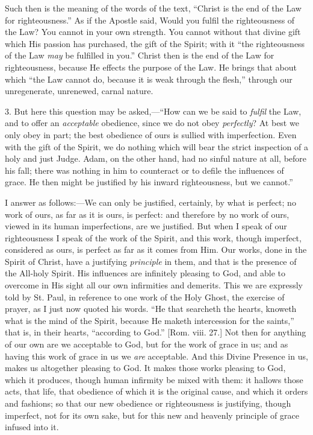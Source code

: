 Such then is the meaning of the words of the text, ``Christ is
the end of the Law for righteousness.'' As if the Apostle said,
Would you fulfil the righteousness of the Law? You cannot in your own
strength. You cannot without that divine gift which His passion has
purchased, the gift of the Spirit; with it ``the righteousness of
the Law \emph{may} be fulfilled in you.'' Christ then is the end
of the Law for righteousness, because He effects the purpose of the
Law. He brings that about which ``the Law cannot do, because it is
weak through the flesh,'' through our unregenerate, unrenewed,
carnal nature.

3. But here this question may be asked,—``How can we be said
to \emph{fulfil} the Law, and to offer an \emph{acceptable} obedience,
since we do not obey \emph{perfectly}? At best we only obey in part;
the best obedience of ours is sullied with imperfection. Even with the
gift of the Spirit, we do nothing which will bear the strict
inspection of a holy and just Judge. Adam, on the other hand, had no
sinful nature at all, before his fall; there was nothing in him to
counteract or to defile the influences of grace. He then might be
justified by his inward righteousness, but we cannot.''

I answer as follows:—We can only be justified, certainly, by what
is perfect; no work of ours, as far as it is ours, is perfect: and
therefore by no work of ours, viewed in its human imperfections, are
we justified. But when I speak of our righteousness I speak of the
work of the Spirit, and this work, though imperfect, considered as
ours, is perfect as far as it comes from Him. Our works, done in the
Spirit of Christ, have a justifying \emph{principle} in them, and that
is the presence of the All-holy Spirit. His influences are infinitely
pleasing to God, and able to overcome in His sight all our own
infirmities and demerits. This we are expressly told by St. Paul, in
reference to one work of the Holy Ghost, the exercise of prayer, as I
just now quoted his words. ``He that searcheth the hearts, knoweth
what is the mind of the Spirit, because He maketh intercession for the
saints,'' that is, in their hearts, ``according to God.''
[Rom. viii. 27.] Not then for anything of our own are we acceptable to
God, but for the work of grace in us; and as having this work of grace
in us we \emph{are} acceptable. And this Divine Presence in us, makes
us altogether pleasing to God. It makes those works pleasing to God,
which it produces, though human infirmity be mixed with them: it
hallows those acts, that life, that obedience of which it is the
original cause, and which it orders and fashions; so that our new
obedience or righteousness is justifying, though imperfect, not for
its own sake, but for this new and heavenly principle of grace infused
into it.

